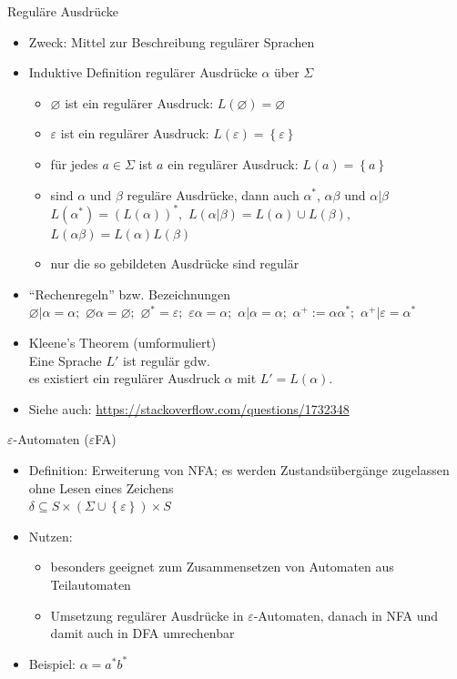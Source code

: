 \begin{frame}{Reguläre Ausdrücke}
	\begin{itemize}
		\item Zweck: Mittel zur Beschreibung regulärer Sprachen
		\item Induktive Definition regulärer Ausdrücke $\alpha$ über $\Sigma$
		\begin{itemize}
			\item $\varnothing $ ist ein regulärer Ausdruck: $L(\varnothing)=\varnothing$
			\item $\varepsilon$ ist ein regulärer Ausdruck: $L(\varepsilon)=\left\{\varepsilon\right\}$
			\item für jedes $a \in \Sigma$ ist $a$ ein regulärer Ausdruck: $L(a)=\left\{a\right\}$
			\item sind $\alpha$ und $\beta$ reguläre Ausdrücke, dann auch $\alpha^*$, $\alpha\beta$ und $\alpha | \beta$\\
			\quad $L(\alpha^*)=(L(\alpha))^*,$ $L(\alpha|\beta)=L(\alpha)\cup L(\beta),$ $L(\alpha\beta)=L(\alpha)L(\beta)$
			\item nur die so gebildeten Ausdrücke sind regulär
		\end{itemize}
		\item "`Rechenregeln"' bzw. Bezeichnungen\\
		\quad $\varnothing|\alpha=\alpha;$ $\varnothing\alpha=\varnothing;$ $\varnothing^*=\varepsilon;$ $\varepsilon\alpha=\alpha;$ $\alpha|\alpha=\alpha;$ $\alpha^+:=\alpha\alpha^*;$ $\alpha^+|\varepsilon=\alpha^*$
		\item Kleene's Theorem (umformuliert)\\
		\quad Eine Sprache $L'$ ist regulär gdw.\\
		\quad es existiert ein regulärer Ausdruck $\alpha$ mit $L'=L(\alpha)$.
		\item Siehe auch: \url{https://stackoverflow.com/questions/1732348}
	\end{itemize}
\end{frame}

\begin{frame}{$\varepsilon$-Automaten ($\varepsilon$FA)}
	\begin{itemize}
		\item Definition: Erweiterung von NFA; es werden Zustandsübergänge zugelassen ohne Lesen eines Zeichens\\
		\quad $\delta\subseteq S \times \left(\Sigma \cup \left\{\varepsilon\right\}\right) \times S$
		\item Nutzen:
		\begin{itemize}
			\item besonders geeignet zum Zusammensetzen von Automaten aus Teilautomaten
			\item Umsetzung regulärer Ausdrücke in $\varepsilon$-Automaten, danach in NFA und damit auch in DFA umrechenbar
		\end{itemize}
		\item Beispiel: $\alpha=a^*b^*$
	\end{itemize}
\end{frame}

